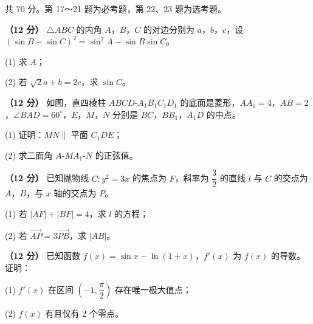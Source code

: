 \begin{gktip}
共 70 分。第 17～21 题为必考题，第 22、23 题为选考题。
\end{gktip}


\begin{question}
\textbf{（12 分）} $\triangle ABC$ 的内角 $A$，$B$，$C$ 的对边分别为 $a$，$b$，$c$，设 $(\sin B-\sin C)^{2}=\sin^{2}A-\sin B\sin C$。

  (1) 求 $A$；

  (2) 若 $\sqrt2a+b=2c$，求 $\sin C$。

\Needspace{0.4\textheight}
\end{question}
\begin{question}
\textbf{（12 分）} 如图，直四棱柱 $ABCD\text{-}A_1B_1C_1D_1$ 的底面是菱形，$AA_1=4$，$AB=2$，$\angle BAD=60^\circ$，$E$，$M$，$N$ 分别是 $BC$，$BB_1$，$A_1D$ 的中点。
\nopagebreak[4]
\begin{center}\end{center}
\nopagebreak[4]
  (1) 证明：$MN\parallel$ 平面 $C_1DE$；

  (2) 求二面角 $A\text{-}MA_1\text{-}N$ 的正弦值。

\end{question}
\begin{question}
\textbf{（12 分）} 已知抛物线 $C:y^{2}=3x$ 的焦点为 $F$，斜率为 $\dfrac32$ 的直线 $l$ 与 $C$ 的交点为 $A$，$B$，与 $x$ 轴的交点为 $P$。

  (1) 若 $|AF|+|BF|=4$，求 $l$ 的方程；

  (2) 若 $\overrightarrow{AP}=3\overrightarrow{PB}$，求 $|AB|$。

\end{question}
\begin{question}
\textbf{（12 分）} 已知函数 $f(x)=\sin x-\ln(1+x)$，$f'(x)$ 为 $f(x)$ 的导数。证明：

  (1) $f'(x)$ 在区间 $\left(-1,\dfrac\pi2\right)$ 存在唯一极大值点；

  (2) $f(x)$ 有且仅有 $2$ 个零点。

\end{question}
